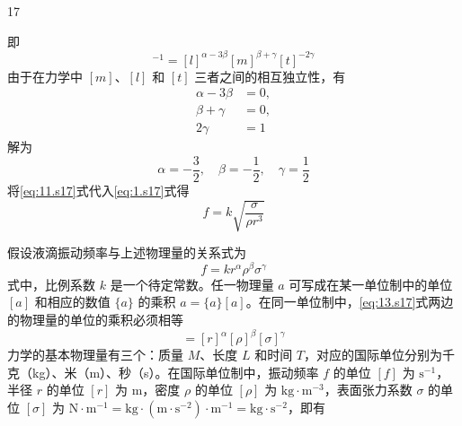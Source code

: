 \begin{solution}{17}
\begin{subsolution}
\begin{subsubproblem}
\begin{equation*}
            \end{equation*}
            即
            \begin{equation}
                [t]^{-1} = [l]^{\alpha - 3\beta}[m]^{\beta + \gamma}[t]^{-2\gamma}
                \label{eq:7.s17}
            \end{equation}
            由于在力学中 $[m]$、$[l]$ 和 $[t]$ 三者之间的相互独立性，有
            \begin{align}
                \alpha - 3\beta &= 0, \label{eq:8.s17} \\
                \beta + \gamma &= 0, \label{eq:9.s17} \\
                2\gamma &= 1 \label{eq:10.s17}
            \end{align}
            解为
            \begin{equation}
                \alpha = -\frac{3}{2}, \quad \beta = -\frac{1}{2}, \quad \gamma = \frac{1}{2}
                \label{eq:11.s17}
            \end{equation}
            将\eqref{eq:11.s17}式代入\eqref{eq:1.s17}式得
            \begin{equation}
                f = k \sqrt{\frac{\sigma}{\rho r^{3}}}
                \label{eq:12.s17}
            \end{equation}
        \end{subsubproblem}
        \begin{subsubproblem}
            假设液滴振动频率与上述物理量的关系式为
            \begin{equation}
                f = k r^{\alpha} \rho^{\beta} \sigma^{\gamma}
                \label{eq:13.s17}
            \end{equation}
            式中，比例系数 $k$ 是一个待定常数。任一物理量 $a$ 可写成在某一单位制中的单位 $[a]$ 和相应的数值 $\{a\}$ 的乘积 $a = \{a\}[a]$。在同一单位制中，\eqref{eq:13.s17}式两边的物理量的单位的乘积必须相等
            \begin{equation}
                [f] = [r]^{\alpha}[\rho]^{\beta}[\sigma]^{\gamma}
                \label{eq:14.s17}
            \end{equation}
            力学的基本物理量有三个：质量 $M$、长度 $L$ 和时间 $T$，对应的国际单位分别为千克（kg）、米（m）、秒（s）。在国际单位制中，振动频率 $f$ 的单位 $[f]$ 为 $\mathrm{s}^{-1}$，半径 $r$ 的单位 $[r]$ 为 $\mathrm{m}$，密度 $\rho$ 的单位 $[\rho]$ 为 $\mathrm{kg} \cdot \mathrm{m}^{-3}$，表面张力系数 $\sigma$ 的单位 $[\sigma]$ 为 $\mathrm{N} \cdot \mathrm{m}^{-1} = \mathrm{kg} \cdot (\mathrm{m} \cdot \mathrm{s}^{-2}) \cdot \mathrm{m}^{-1} = \mathrm{kg} \cdot \mathrm{s}^{-2}$，即有

\end{subsubproblem}
\end{subsolution}
\end{solution}
